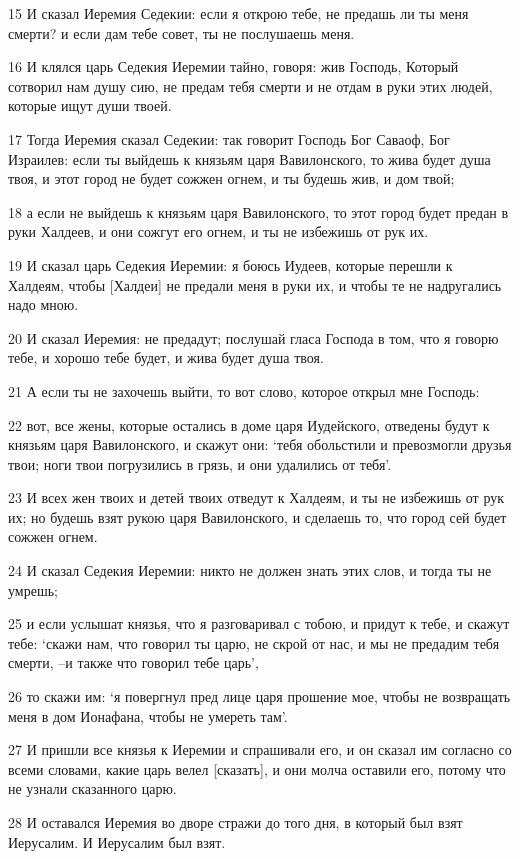 \par 15 И сказал Иеремия Седекии: если я открою тебе, не предашь ли ты меня смерти? и если дам тебе совет, ты не послушаешь меня.
\par 16 И клялся царь Седекия Иеремии тайно, говоря: жив Господь, Который сотворил нам душу сию, не предам тебя смерти и не отдам в руки этих людей, которые ищут души твоей.
\par 17 Тогда Иеремия сказал Седекии: так говорит Господь Бог Саваоф, Бог Израилев: если ты выйдешь к князьям царя Вавилонского, то жива будет душа твоя, и этот город не будет сожжен огнем, и ты будешь жив, и дом твой;
\par 18 а если не выйдешь к князьям царя Вавилонского, то этот город будет предан в руки Халдеев, и они сожгут его огнем, и ты не избежишь от рук их.
\par 19 И сказал царь Седекия Иеремии: я боюсь Иудеев, которые перешли к Халдеям, чтобы [Халдеи] не предали меня в руки их, и чтобы те не надругались надо мною.
\par 20 И сказал Иеремия: не предадут; послушай гласа Господа в том, что я говорю тебе, и хорошо тебе будет, и жива будет душа твоя.
\par 21 А если ты не захочешь выйти, то вот слово, которое открыл мне Господь:
\par 22 вот, все жены, которые остались в доме царя Иудейского, отведены будут к князьям царя Вавилонского, и скажут они: `тебя обольстили и превозмогли друзья твои; ноги твои погрузились в грязь, и они удалились от тебя'.
\par 23 И всех жен твоих и детей твоих отведут к Халдеям, и ты не избежишь от рук их; но будешь взят рукою царя Вавилонского, и сделаешь то, что город сей будет сожжен огнем.
\par 24 И сказал Седекия Иеремии: никто не должен знать этих слов, и тогда ты не умрешь;
\par 25 и если услышат князья, что я разговаривал с тобою, и придут к тебе, и скажут тебе: `скажи нам, что говорил ты царю, не скрой от нас, и мы не предадим тебя смерти, --и также что говорил тебе царь',
\par 26 то скажи им: `я повергнул пред лице царя прошение мое, чтобы не возвращать меня в дом Ионафана, чтобы не умереть там'.
\par 27 И пришли все князья к Иеремии и спрашивали его, и он сказал им согласно со всеми словами, какие царь велел [сказать], и они молча оставили его, потому что не узнали сказанного царю.
\par 28 И оставался Иеремия во дворе стражи до того дня, в который был взят Иерусалим. И Иерусалим был взят.

